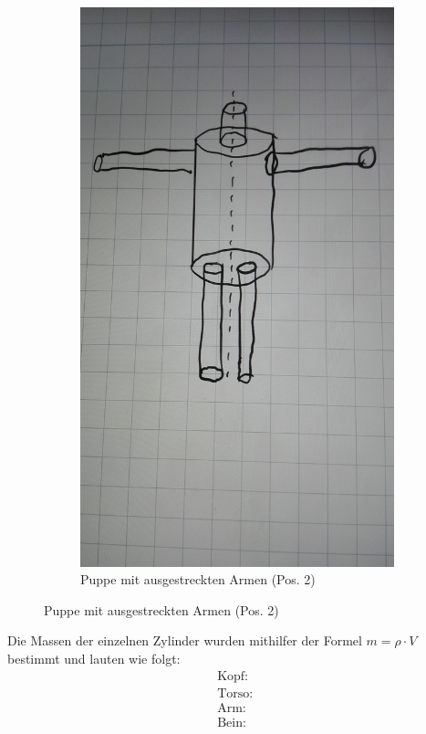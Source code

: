 \begin{figure}[H]
\begin{subfigure}{0.495\linewidth}
\includegraphics[width=\textwidth]{images/puppe_aus.jpg}
\caption{Puppe mit ausgestreckten Armen (Pos. 2)}
\end{subfigure}
\end{figure}

Die Massen der einzelnen Zylinder wurden mithilfer der Formel $m= \rho \cdot V$ bestimmt und lauten wie folgt:
\begin{subequations}
\begin{align}
\text{Kopf: }\label{eq:Kopf}\\
\text{Torso: }\label{eq:Torso}\\
\text{Arm: }\label{eq:Arm}\\
\text{Bein: }\label{eq:Bein}
\end{align}
\end{subequations}

